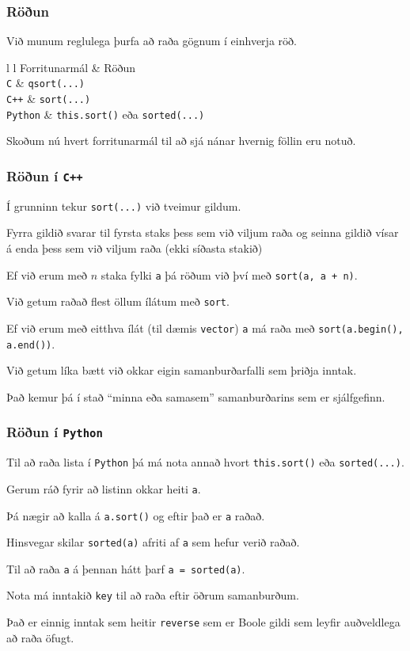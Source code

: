 {
	\frametitle{Röðun}
	{
		\item<1-> Við munum reglulega þurfa að raða gögnum í einhverja röð.
		\item<2->[]
		{
			{l l}
			Forritunarmál & Röðun\\
			\hline
			\texttt{C} & \texttt{qsort(...)}\\
			\texttt{C++} & \texttt{sort(...)}\\
			\texttt{Python} & \texttt{this.sort()} eða \texttt{sorted(...)}\\
		}
		\item<3-> Skoðum nú hvert forritunarmál til að sjá nánar hvernig föllin eru notuð.
	}
}

{
	\frametitle{Röðun í \texttt{C++}}
	{
		\item<1-> Í grunninn tekur \texttt{sort(...)} við tveimur gildum.
		\item<2-> Fyrra gildið svarar til fyrsta staks þess sem við viljum raða og seinna gildið vísar á enda þess sem við viljum raða
			(ekki síðasta stakið)
		\item<3-> Ef við erum með $n$ staka fylki \texttt{a} þá röðum við því með \texttt{sort(a, a + n)}.
		\item<4-> Við getum raðað flest öllum ílátum með \texttt{sort}.
		\item<5-> Ef við erum með eitthva ílát (til dæmis \texttt{vector}) \texttt{a} má raða með \texttt{sort(a.begin(), a.end())}.
		\item<6-> Við getum líka bætt við okkar eigin samanburðarfalli sem þriðja inntak.
		\item<7-> Það kemur þá í stað ``minna eða samasem'' samanburðarins sem er sjálfgefinn.
	}
}

{
	\frametitle{Röðun í \texttt{Python}}
	{
		\item<1-> Til að raða lista í \texttt{Python} þá má nota annað hvort \texttt{this.sort()} eða \texttt{sorted(...)}.
		\item<2-> Gerum ráð fyrir að listinn okkar heiti \texttt{a}.
		\item<3-> Þá nægir að kalla á \texttt{a.sort()} og eftir það er \texttt{a} raðað.
		\item<4-> Hinsvegar skilar \texttt{sorted(a)} afriti af \texttt{a} sem hefur verið raðað.
		\item<5-> Til að raða \texttt{a} á þennan hátt þarf \texttt{a = sorted(a)}.
		\item<6-> Nota má inntakið \texttt{key} til að raða eftir öðrum samanburðum.
		\item<7-> Það er einnig inntak sem heitir \texttt{reverse} sem er Boole gildi sem leyfir auðveldlega að raða öfugt.
	}
}

